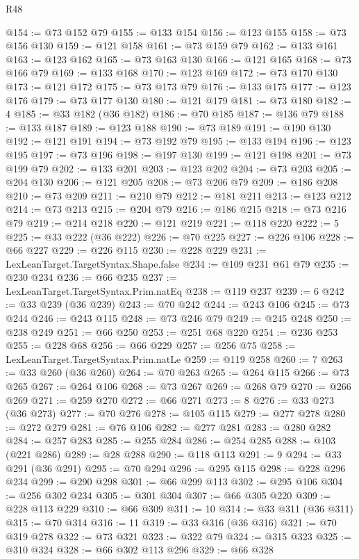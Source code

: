\begin{lexlean}{R48}
\begin{coremodule}
@154 := @73 @152 @79
@155 := @133 @154
@156 := @123 @155
@158 := @73 @156 @130
@159 := @121 @158
@161 := @73 @159 @79
@162 := @133 @161
@163 := @123 @162
@165 := @73 @163 @130
@166 := @121 @165
@168 := @73 @166 @79
@169 := @133 @168
@170 := @123 @169
@172 := @73 @170 @130
@173 := @121 @172
@175 := @73 @173 @79
@176 := @133 @175
@177 := @123 @176
@179 := @73 @177 @130
@180 := @121 @179
@181 := @73 @180
@182 := 4
@185 := @33 @182 (@36 @182)
@186 := @70 @185
@187 := @136 @79
@188 := @133 @187
@189 := @123 @188
@190 := @73 @189
@191 := @190 @130
@192 := @121 @191
@194 := @73 @192 @79
@195 := @133 @194
@196 := @123 @195
@197 := @73 @196
@198 := @197 @130
@199 := @121 @198
@201 := @73 @199 @79
@202 := @133 @201
@203 := @123 @202
@204 := @73 @203
@205 := @204 @130
@206 := @121 @205
@208 := @73 @206 @79
@209 := @186 @208
@210 := @73 @209
@211 := @210 @79
@212 := @181 @211
@213 := @123 @212
@214 := @73 @213
@215 := @204 @79
@216 := @186 @215
@218 := @73 @216 @79
@219 := @214 @218
@220 := @121 @219
@221 := @118 @220
@222 := 5
@225 := @33 @222 (@36 @222)
@226 := @70 @225
@227 := @226 @106
@228 := @66 @227
@229 := @226 @115
@230 := @228 @229
@231 := LexLeanTarget.TargetSyntax.Shape.false
@234 := @109 @231 @61 @79
@235 := @230 @234
@236 := @66 @235
@237 := LexLeanTarget.TargetSyntax.Prim.natEq
@238 := @119 @237
@239 := 6
@242 := @33 @239 (@36 @239)
@243 := @70 @242
@244 := @243 @106
@245 := @73 @244
@246 := @243 @115
@248 := @73 @246 @79
@249 := @245 @248
@250 := @238 @249
@251 := @66 @250
@253 := @251 @68 @220
@254 := @236 @253
@255 := @228 @68
@256 := @66 @229
@257 := @256 @75
@258 := LexLeanTarget.TargetSyntax.Prim.natLe
@259 := @119 @258
@260 := 7
@263 := @33 @260 (@36 @260)
@264 := @70 @263
@265 := @264 @115
@266 := @73 @265
@267 := @264 @106
@268 := @73 @267
@269 := @268 @79
@270 := @266 @269
@271 := @259 @270
@272 := @66 @271
@273 := 8
@276 := @33 @273 (@36 @273)
@277 := @70 @276
@278 := @105 @115
@279 := @277 @278
@280 := @272 @279
@281 := @76 @106
@282 := @277 @281
@283 := @280 @282
@284 := @257 @283
@285 := @255 @284
@286 := @254 @285
@288 := @103 (@221 @286)
@289 := @28 @288
@290 := @118 @113
@291 := 9
@294 := @33 @291 (@36 @291)
@295 := @70 @294
@296 := @295 @115
@298 := @228 @296 @234
@299 := @290 @298
@301 := @66 @299 @113
@302 := @295 @106
@304 := @256 @302 @234
@305 := @301 @304
@307 := @66 @305 @220
@309 := @228 @113 @229
@310 := @66 @309
@311 := 10
@314 := @33 @311 (@36 @311)
@315 := @70 @314
@316 := 11
@319 := @33 @316 (@36 @316)
@321 := @70 @319 @278
@322 := @73 @321
@323 := @322 @79
@324 := @315 @323
@325 := @310 @324
@328 := @66 @302 @113 @296
@329 := @66 @328

\end{coremodule}
\end{lexlean}
